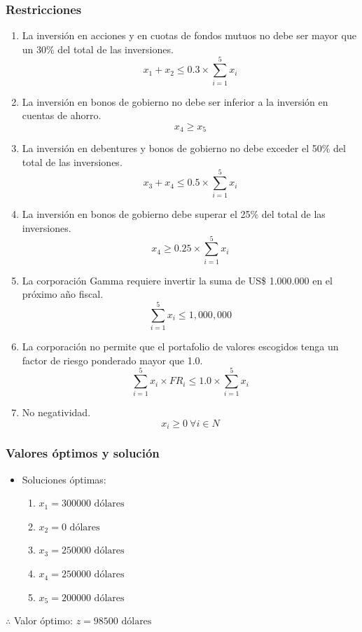 \documentclass[a4paper,12pt]{article}
\begin{document}
\subsubsection{Restricciones}
\begin{enumerate}
	\item La inversión en acciones y en cuotas de fondos mutuos no debe ser mayor que un
	30\% del total de  las  inversiones.
	\begin{equation*}
		x_1 + x_2 \leq 0.3\times\sum_{i = 1}^{5}x_i
	\end{equation*}
	\item La  inversión  en  bonos  de  gobierno  no  debe  ser  inferior  a  la  inversión  en  cuentas  de  ahorro.
	\begin{equation*}
		x_4 \geq x_5
	\end{equation*}
	\item La inversión en debentures y bonos de gobierno no debe exceder el 50\% del total de las inversiones.
	\begin{equation*}
		x_3 + x_4 \leq 0.5\times\sum_{i = 1}^{5}x_i
	\end{equation*}
	\item La inversión en bonos de gobierno debe superar el 25\% del total de las inversiones.
	\begin{equation*}
		x_4 \geq 0.25\times\sum_{i = 1}^{5}x_i
	\end{equation*}
	\item La corporación Gamma    requiere invertir  la  suma  de  US\$  1.000.000  en el  próximo  año  fiscal.
	\begin{equation*}
		\sum_{i = 1}^{5}x_i \leq 1,000,000
	\end{equation*} 
	\item La corporación  no  permite  que el  portafolio  de  valores  escogidos  tenga  un  factor de  riesgo ponderado mayor que 1.0.
	\begin{equation*}
		\sum_{i = 1}^{5}x_i\times FR_i \leq 1.0 \times \sum_{i = 1}^{5}x_i
	\end{equation*}
	\item No negatividad.
	\begin{equation*}
		x_i\geq 0\ \forall i \in N
	\end{equation*}
\end{enumerate}
\subsubsection{Valores óptimos y solución}
\begin{itemize}
	\item Soluciones óptimas:
	\begin{enumerate}
		\item $x_1=300000\text{ dólares}$
		\item $x_2=0\text{ dólares}$
		\item $x_3=250000\text{ dólares}$
		\item $x_4=250000\text{ dólares}$
		\item $x_5=200000\text{ dólares}$
	\end{enumerate}
\end{itemize}
$\therefore$ Valor óptimo: $z=98500 \text{ dólares}$
\newpage
\end{document}
